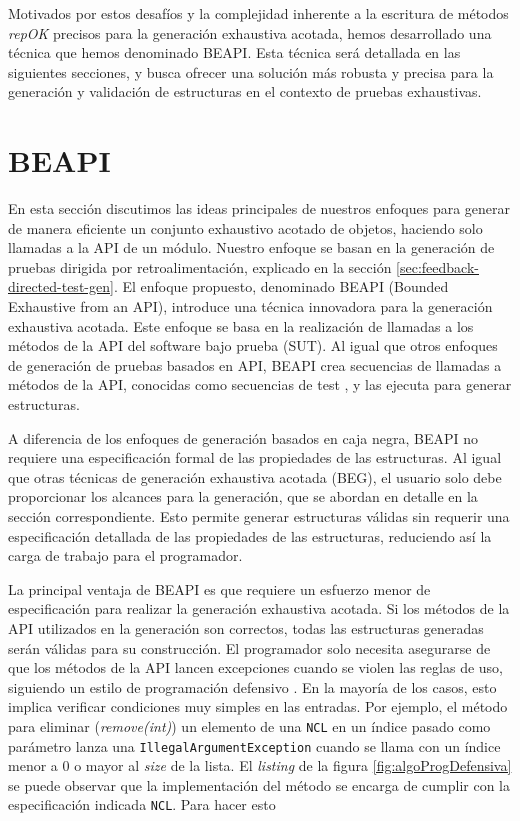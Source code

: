 Motivados por estos desafíos y la complejidad inherente a la escritura de métodos \emph{repOK} precisos para la generación exhaustiva acotada, hemos desarrollado una técnica que hemos denominado BEAPI. 
Esta técnica será detallada en las siguientes secciones, y busca ofrecer una solución más robusta y precisa para la generación y validación de estructuras en el contexto de pruebas exhaustivas.


\section[BEAPI]{BEAPI}
\label{sec:beapiIntro}

En esta sección discutimos las ideas principales de nuestros enfoques para generar de manera eficiente un conjunto exhaustivo acotado de objetos, haciendo solo llamadas a la API de un módulo. Nuestro enfoque se basan en la generación de pruebas dirigida por retroalimentación, explicado en la sección \ref{sec:feedback-directed-test-gen}.
El enfoque propuesto, denominado \textsf{BEAPI} (Bounded Exhaustive from an API), introduce una técnica innovadora para la generación exhaustiva acotada. Este enfoque se basa en la realización de llamadas a los métodos de la API del software bajo prueba (SUT). Al igual que otros enfoques de generación de pruebas basados en API, \textsf{BEAPI} crea secuencias de llamadas a métodos de la API, conocidas como secuencias de test \cite{Ammann16}, y las ejecuta para generar estructuras. 

A diferencia de los enfoques de generación basados en caja negra, \textsf{BEAPI} no requiere una especificación formal de las propiedades de las estructuras. Al igual que otras técnicas de generación exhaustiva acotada (BEG), el usuario solo debe proporcionar los alcances para la generación, que se abordan en detalle en la sección correspondiente.  Esto permite generar estructuras válidas sin requerir una especificación detallada de las propiedades de las estructuras, reduciendo así la carga de trabajo para el programador.

La principal ventaja de \textsf{BEAPI} es que requiere un esfuerzo menor de especificación para realizar la generación exhaustiva acotada. Si los métodos de la API utilizados en la generación son correctos, todas las estructuras generadas serán válidas para su construcción. El programador solo necesita asegurarse de que los métodos de la API lancen excepciones cuando se violen las reglas de uso, siguiendo un estilo de programación defensivo \cite{Liskov00}. En la mayoría de los casos, esto implica verificar condiciones muy simples en las entradas. Por ejemplo, el método para eliminar (\emph{remove(int)}) un elemento de una \texttt{NCL} en un índice pasado como parámetro lanza una \texttt{IllegalArgumentException} cuando se llama con un índice menor a 0 o mayor al \emph{size} de la lista. El \emph{listing} de la figura \ref{fig:algoProgDefensiva}  se puede observar que la implementación del método se encarga de cumplir con la especificación indicada \texttt{NCL}.
Para hacer esto


